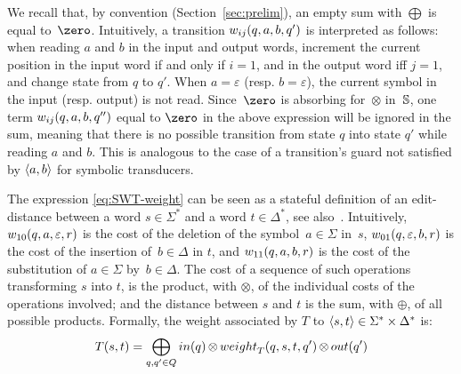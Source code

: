 %
We recall that, by convention (Section~\ref{sec:prelim}),
an empty sum with $\bigoplus$ is equal to~$\zero$.
%
Intuitively,  a transition $\wei_{ij}(q, a, b, q')$ is interpreted as follows:
when reading $a$ and $b$ in the input and output words,
increment the current position in the input word if and only if $i = 1$,
and in the output word iff $j = 1$, %
and change state from $q$ to $q'$.
When $a = \varepsilon$ (resp. $b = \varepsilon$), the current symbol
in the input (resp. output) is not read.
%
%
Since~$\zero$ is absorbing for~$\otimes$ in~$\mathbb{S}$,
one term $\wei_{ij}(q, a, b, q'')$ equal to $\zero$ in the above expression
will be ignored in the sum, meaning that there is no possible transition
from state $q$ into state $q'$ while reading $a$ and $b$.
This is analogous to the case of a transition's guard not satisfied by $\<a, b>$ for
symbolic transducers.

%

The expression \eqref{eq:SWT-weight}
can be seen as a stateful definition of
an edit-distance between a word $s \in \Sigma^*$ and a word $t \in \Delta^*$,
see also~\cite{Mohri03ijfcs}.
Intuitively,
$\wei_{10}(q, a, \varepsilon, r)$ is the cost of
the deletion of the symbol~$a \in \Sigma$ in~$s$,
$\wei_{01}(q, \varepsilon, b, r)$ is the cost
of the insertion of~$b \in \Delta$ in $t$,
and $\wei_{11}(q, a, b, r)$ is the cost
of the substitution of  $a \in \Sigma$ by~$b \in \Delta$.
%
The cost of a sequence of such operations transforming $s$ into $t$,
is the product, with $\otimes$, of the individual costs of the operations involved;
and the distance between $s$ and $t$ is the sum, with $\oplus$,
of all possible products.
%
\medskip\noindent
Formally, the weight associated by $T$ to $\< s, t> \in \Sigma^* \times \Delta^*$ is:
\begin{equation}
T(s, t)  =
\displaystyle\bigoplus_{q, q' \in Q} \init(q)
\mathop{\otimes} \weight_T(q, s, t, q') \mathop{\otimes} \final(q')
\label{eq:SWT-value}
\end{equation}

